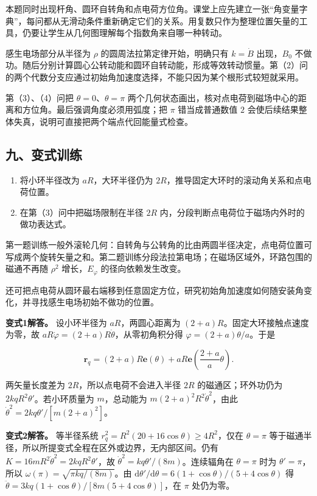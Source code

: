 \documentclass[12pt,a4paper,UTF8]{ctexart}
\newcommand{\tightlist}{\setlength{\itemsep}{0pt}\setlength{\parskip}{0pt}}
\begin{document}
本题同时出现杆角、圆环自转角和点电荷方位角。课堂上应先建立一张``角变量字典''，每问都从无滑动条件重新确定它们的关系。用复数只作为整理位置矢量的工具，仍要让学生从几何图理解每个指数角来自哪一种转动。

感生电场部分从半径为 \(\rho\) 的圆周法拉第定律开始，明确只有
\(k=\dot B\) 出现，\(B_0\)
不做功。随后分别计算圆心公转动能和圆环自转动能，形成等效转动惯量。第（2）问的两个代数分支应通过初始角加速度选择，不能只因为某个根形式较短就采用。

第（3）、（4）问把 \(\theta=0\)、\(\theta=\pi\)
两个几何状态画出，核对点电荷到磁场中心的距离和方位角。最后强调角度必须用弧度；把
\(\pi\) 错当成普通数值 \(2\)
会使后续结果整体失真，说明可直接把两个端点代回能量式检查。

\subsection{九、变式训练}\label{ux4e5dux53d8ux5f0fux8badux7ec3-4}

\begin{enumerate}
\def\labelenumi{\arabic{enumi}.}
\tightlist
\item
  将小环半径改为 \(aR\)，大环半径仍为
  \(2R\)，推导固定大环时的滚动角关系和点电荷位置。
\item
  在第（3）问中把磁场限制在半径 \(2R\)
  内，分段判断点电荷位于磁场内外时的做功表达式。
\end{enumerate}

第一题训练一般外滚轮几何：自转角与公转角的比由两圆半径决定，点电荷位置可写成两个旋转矢量之和。第二题训练分段法拉第电场；在磁场区域外，环路包围的磁通不再随
\(\rho^2\) 增长，\(E_\varphi\) 的径向依赖发生改变。

还可把点电荷从圆环最右端移到任意固定方位，研究初始角加速度如何随安装角变化，并寻找感生电场初始不做功的位置。

\textbf{变式1解答。} 设小环半径为 \(aR\)，两圆心距离为
\((2+a)R\)。固定大环接触点速度为零，故
\(aR\dot\varphi=(2+a)R\dot\theta\)，从零初角积分得
\(\varphi=(2+a)\theta/a\)。于是

\[\boldsymbol r_q=(2+a)R\boldsymbol e(\theta)+aR\boldsymbol e\!\left(\frac{2+a}{a}\theta\right).\]

两矢量长度差为 \(2R\)，所以点电荷不会进入半径 \(2R\)
的磁通区；环外功仍为 \(2kqR^2\theta'\)。若小环质量为 \(m\)，总动能为
\(m(2+a)^2R^2\dot\theta^2\)，由此
\(\dot\theta^2=2kq\theta'/[m(2+a)^2]\)。

\textbf{变式2解答。} 等半径系统
\(r_q^2=R^2(20+16\cos\theta)\ge4R^2\)，仅在 \(\theta=\pi\)
等于磁通半径，所以所提变式全程在区外或边界，无内部区间。仍有
\(K=16mR^2\dot\theta^2=2kqR^2\theta'\)，故
\(\dot\theta^2=kq\theta'/(8m)\)。连续辐角在 \(\theta=\pi\) 时为
\(\theta'=\pi\)，所以 \(\omega(\pi)=\sqrt{\pi kq/(8m)}\)。由
\(\mathrm d\theta'/\mathrm d\theta=6(1+\cos\theta)/(5+4\cos\theta)\) 得
\(\ddot\theta=3kq(1+\cos\theta)/[8m(5+4\cos\theta)]\)，在 \(\pi\)
处仍为零。
\end{document}
